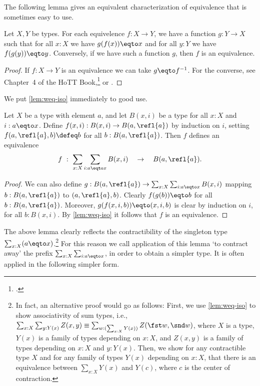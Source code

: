 The following lemma gives an equivalent characterization
of equivalence that is sometimes easy to use.

\begin{lemma}\label{lem:weq-iso}
  Let $X,Y$ be types. For each equivelence $f: X\to Y$, we have a function $g: Y\to X$ such that for all $x:X$ we have $g(f(x)) \eqto x$ and for all
  $y:Y$ we have $f(g(y)) \eqto y$. Conversely, if we have such a function $g$, then $f$ is an equivalence.
\end{lemma}
\begin{proof}
If $f: X\to Y$ is an equivalence we can take $g \eqto f^{-1}$.
For the converse, see Chapter~4 of the HoTT Book,\footcite{hottbook} or .
\end{proof}

We put \cref{lem:weq-iso} immediately to good use.

\begin{lemma}\label{lem:contract-away}
Let $X$ be a type with element $a$, and let
$B(x,i)$ be a type for all $x:X$ and $i: a \eqto x$.
Define $f(x,i): B(x,i) \to B(a,\refl{a})$ by induction on $i$,
setting $f(a,\refl{a},b) \defeq b$ for all $b:B(a,\refl{a})$.
Then $f$ defines an equivalence
\[
f~:~ \sum_{x:X} \sum_{i: a \eqto x} B(x,i) \quad \to \quad B(a,\refl{a}).
\]
\end{lemma}
\begin{proof}
We can also define
$g: B(a,\refl{a})\to \sum_{x:X} \sum_{i: a \eqto x} B(x,i)$
mapping $b: B(a,\refl{a})$ to $(a,\refl{a},b)$.
Clearly $f(g(b)) \eqto b$ for all $b:B(a,\refl{a})$.
Moreover, $g(f(x,i,b)) \eqto (x,i,b)$ is clear by induction
on $i$, for all $b:B(x,i)$.
By \cref{lem:weq-iso} it follows that $f$
is an equivalence.
\end{proof}

The above lemma clearly reflects the  contractibility of the
singleton type $\sum_{x:X}(a \eqto x)$.\footnote{%
  In fact, an alternative proof would go as follows:
  First, we use \cref{lem:weq-iso} to show associativity of sum types,
  i.e., $\sum_{x:X}\sum_{y:Y(x)}Z(x,y)
  \equiv \sum_{w : (\sum_{x:X}Y(x))}Z(\fst w,\snd w)$,
  where $X$ is a type,
  $Y(x)$ is a family of types depending on $x:X$,
  and $Z(x,y)$ is a family of types depending on $x:X$ and $y:Y(x)$.
  Then, we show for any contractible type $X$
  and for any family of types $Y(x)$ depending on $x:X$,
  that there is an equivalence between $\sum_{x:X}Y(x)$ and $Y(c)$,
  where $c$ is the center of contraction.}
For this reason
we call application of this lemma `to contract away'
the prefix $\sum_{x:X} \sum_{i: a \eqto x}$, in order
to obtain a simpler type. It is often applied
in the following simpler form.

